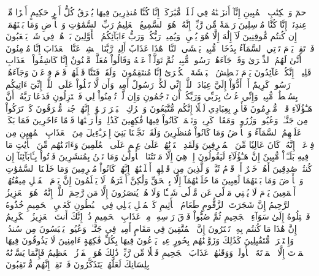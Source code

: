 حمٓ
وَٱلۡكِتَٰبِ ٱلۡمُبِينِ
إِنَّآ أَنزَلۡنَٰهُ فِي لَيۡلَةٖ مُّبَٰرَكَةٍۚ إِنَّا كُنَّا مُنذِرِينَ
فِيهَا يُفۡرَقُ كُلُّ أَمۡرٍ حَكِيمٍ
أَمۡرٗا مِّنۡ عِندِنَآۚ إِنَّا كُنَّا مُرۡسِلِينَ
رَحۡمَةٗ مِّن رَّبِّكَۚ إِنَّهُۥ هُوَ ٱلسَّمِيعُ ٱلۡعَلِيمُ
رَبِّ ٱلسَّمَٰوَٰتِ وَٱلۡأَرۡضِ وَمَا بَيۡنَهُمَآۖ إِن كُنتُم مُّوقِنِينَ
لَآ إِلَٰهَ إِلَّا هُوَ يُحۡيِۦ وَيُمِيتُۖ رَبُّكُمۡ وَرَبُّ ءَابَآئِكُمُ ٱلۡأَوَّلِينَ
بَلۡ هُمۡ فِي شَكّٖ يَلۡعَبُونَ
فَٱرۡتَقِبۡ يَوۡمَ تَأۡتِي ٱلسَّمَآءُ بِدُخَانٖ مُّبِينٖ
يَغۡشَى ٱلنَّاسَۖ هَٰذَا عَذَابٌ أَلِيمٞ
رَّبَّنَا ٱكۡشِفۡ عَنَّا ٱلۡعَذَابَ إِنَّا مُؤۡمِنُونَ
أَنَّىٰ لَهُمُ ٱلذِّكۡرَىٰ وَقَدۡ جَآءَهُمۡ رَسُولٞ مُّبِينٞ
ثُمَّ تَوَلَّوۡاْ عَنۡهُ وَقَالُواْ مُعَلَّمٞ مَّجۡنُونٌ
إِنَّا كَاشِفُواْ ٱلۡعَذَابِ قَلِيلًاۚ إِنَّكُمۡ عَآئِدُونَ
يَوۡمَ نَبۡطِشُ ٱلۡبَطۡشَةَ ٱلۡكُبۡرَىٰٓ إِنَّا مُنتَقِمُونَ
۞وَلَقَدۡ فَتَنَّا قَبۡلَهُمۡ قَوۡمَ فِرۡعَوۡنَ وَجَآءَهُمۡ رَسُولٞ كَرِيمٌ
أَنۡ أَدُّوٓاْ إِلَيَّ عِبَادَ ٱللَّهِۖ إِنِّي لَكُمۡ رَسُولٌ أَمِينٞ
وَأَن لَّا تَعۡلُواْ عَلَى ٱللَّهِۖ إِنِّيٓ ءَاتِيكُم بِسُلۡطَٰنٖ مُّبِينٖ
وَإِنِّي عُذۡتُ بِرَبِّي وَرَبِّكُمۡ أَن تَرۡجُمُونِ
وَإِن لَّمۡ تُؤۡمِنُواْ لِي فَٱعۡتَزِلُونِ
فَدَعَا رَبَّهُۥٓ أَنَّ هَـٰٓؤُلَآءِ قَوۡمٞ مُّجۡرِمُونَ
فَأَسۡرِ بِعِبَادِي لَيۡلًا إِنَّكُم مُّتَّبَعُونَ
وَٱتۡرُكِ ٱلۡبَحۡرَ رَهۡوًاۖ إِنَّهُمۡ جُندٞ مُّغۡرَقُونَ
كَمۡ تَرَكُواْ مِن جَنَّـٰتٖ وَعُيُونٖ
وَزُرُوعٖ وَمَقَامٖ كَرِيمٖ
وَنَعۡمَةٖ كَانُواْ فِيهَا فَٰكِهِينَ
كَذَٰلِكَۖ وَأَوۡرَثۡنَٰهَا قَوۡمًا ءَاخَرِينَ
فَمَا بَكَتۡ عَلَيۡهِمُ ٱلسَّمَآءُ وَٱلۡأَرۡضُ وَمَا كَانُواْ مُنظَرِينَ
وَلَقَدۡ نَجَّيۡنَا بَنِيٓ إِسۡرَـٰٓءِيلَ مِنَ ٱلۡعَذَابِ ٱلۡمُهِينِ
مِن فِرۡعَوۡنَۚ إِنَّهُۥ كَانَ عَالِيٗا مِّنَ ٱلۡمُسۡرِفِينَ
وَلَقَدِ ٱخۡتَرۡنَٰهُمۡ عَلَىٰ عِلۡمٍ عَلَى ٱلۡعَٰلَمِينَ
وَءَاتَيۡنَٰهُم مِّنَ ٱلۡأٓيَٰتِ مَا فِيهِ بَلَـٰٓؤٞاْ مُّبِينٌ
إِنَّ هَـٰٓؤُلَآءِ لَيَقُولُونَ
إِنۡ هِيَ إِلَّا مَوۡتَتُنَا ٱلۡأُولَىٰ وَمَا نَحۡنُ بِمُنشَرِينَ
فَأۡتُواْ بِـَٔابَآئِنَآ إِن كُنتُمۡ صَٰدِقِينَ
أَهُمۡ خَيۡرٌ أَمۡ قَوۡمُ تُبَّعٖ وَٱلَّذِينَ مِن قَبۡلِهِمۡ أَهۡلَكۡنَٰهُمۡۚ إِنَّهُمۡ كَانُواْ مُجۡرِمِينَ
وَمَا خَلَقۡنَا ٱلسَّمَٰوَٰتِ وَٱلۡأَرۡضَ وَمَا بَيۡنَهُمَا لَٰعِبِينَ
مَا خَلَقۡنَٰهُمَآ إِلَّا بِٱلۡحَقِّ وَلَٰكِنَّ أَكۡثَرَهُمۡ لَا يَعۡلَمُونَ
إِنَّ يَوۡمَ ٱلۡفَصۡلِ مِيقَٰتُهُمۡ أَجۡمَعِينَ
يَوۡمَ لَا يُغۡنِي مَوۡلًى عَن مَّوۡلٗى شَيۡـٔٗا وَلَا هُمۡ يُنصَرُونَ
إِلَّا مَن رَّحِمَ ٱللَّهُۚ إِنَّهُۥ هُوَ ٱلۡعَزِيزُ ٱلرَّحِيمُ
إِنَّ شَجَرَتَ ٱلزَّقُّومِ
طَعَامُ ٱلۡأَثِيمِ
كَٱلۡمُهۡلِ يَغۡلِي فِي ٱلۡبُطُونِ
كَغَلۡيِ ٱلۡحَمِيمِ
خُذُوهُ فَٱعۡتِلُوهُ إِلَىٰ سَوَآءِ ٱلۡجَحِيمِ
ثُمَّ صُبُّواْ فَوۡقَ رَأۡسِهِۦ مِنۡ عَذَابِ ٱلۡحَمِيمِ
ذُقۡ إِنَّكَ أَنتَ ٱلۡعَزِيزُ ٱلۡكَرِيمُ
إِنَّ هَٰذَا مَا كُنتُم بِهِۦ تَمۡتَرُونَ
إِنَّ ٱلۡمُتَّقِينَ فِي مَقَامٍ أَمِينٖ
فِي جَنَّـٰتٖ وَعُيُونٖ
يَلۡبَسُونَ مِن سُندُسٖ وَإِسۡتَبۡرَقٖ مُّتَقَٰبِلِينَ
كَذَٰلِكَ وَزَوَّجۡنَٰهُم بِحُورٍ عِينٖ
يَدۡعُونَ فِيهَا بِكُلِّ فَٰكِهَةٍ ءَامِنِينَ
لَا يَذُوقُونَ فِيهَا ٱلۡمَوۡتَ إِلَّا ٱلۡمَوۡتَةَ ٱلۡأُولَىٰۖ وَوَقَىٰهُمۡ عَذَابَ ٱلۡجَحِيمِ
فَضۡلٗا مِّن رَّبِّكَۚ ذَٰلِكَ هُوَ ٱلۡفَوۡزُ ٱلۡعَظِيمُ
فَإِنَّمَا يَسَّرۡنَٰهُ بِلِسَانِكَ لَعَلَّهُمۡ يَتَذَكَّرُونَ
فَٱرۡتَقِبۡ إِنَّهُم مُّرۡتَقِبُونَ